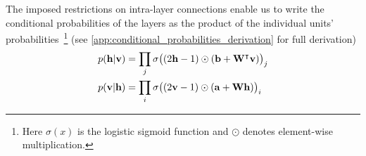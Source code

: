 The imposed restrictions on intra-layer connections enable us to write the conditional probabilities of the layers as the product of the individual units' probabilities~\footnote{Here \( \sigma(x) \) is the logistic sigmoid function and \( \odot \) denotes element-wise multiplication.} (see \cref{app:conditional_probabilities_derivation} for full derivation)
\begin{align}
\begin{split}
    p(\mathbf{h} | \mathbf{v})
        &= \prod_j \sigma\big( (2\mathbf{h} - 1) \odot (\mathbf{b} + \mathbf{W}^\intercal\mathbf{v}) \big)_j \\
    p(\mathbf{v} | \mathbf{h})
        &= \prod_i \sigma\big( (2\mathbf{v} - 1) \odot (\mathbf{a} + \mathbf{W}\mathbf{h}) \big)_i
\end{split}
\end{align}


